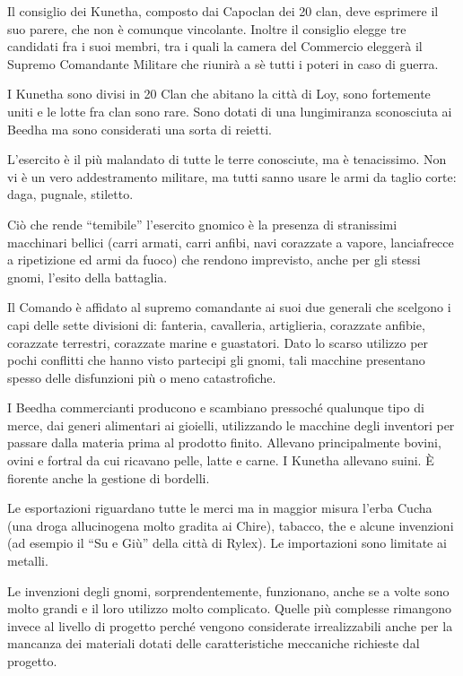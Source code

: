 Il consiglio dei Kunetha, composto dai Capoclan dei 20 clan, deve
esprimere il suo parere, che non \`e comunque vincolante.  Inoltre il
consiglio elegge tre candidati fra i suoi membri, tra i quali la
camera del Commercio elegger\`a il Supremo Comandante Militare che
riunir\`a a s\`e tutti i poteri in caso di guerra.

I Kunetha sono divisi in 20 Clan che abitano la citt\`a di Loy, sono
fortemente uniti e le lotte fra clan sono rare. Sono dotati di una
lungimiranza sconosciuta ai Beedha ma sono considerati una sorta di
reietti.

\Esercito L'esercito \`e il pi\`u malandato di tutte le terre
conosciute, ma \`e tenacissimo.  Non vi \`e un vero addestramento
militare, ma tutti sanno usare le armi da taglio corte: daga, pugnale,
stiletto.  

Ci\`o che rende ``temibile'' l'esercito gnomico \`e la presenza di
stranissimi macchinari bellici (carri armati, carri anfibi, navi
corazzate a vapore, lanciafrecce a ripetizione ed armi da fuoco) che
rendono imprevisto, anche per gli stessi gnomi, l'esito della
battaglia.

Il Comando \`e affidato al supremo comandante ai suoi due generali che
scelgono i capi delle sette divisioni di: fanteria, cavalleria,
artiglieria, corazzate anfibie, corazzate terrestri, corazzate marine
e guastatori. Dato lo scarso utilizzo per pochi conflitti che hanno
visto partecipi gli gnomi, tali macchine presentano spesso delle
disfunzioni pi\`u o meno catastrofiche.

\Economia I Beedha commercianti producono e scambiano pressoch\'e
qualunque tipo di merce, dai generi alimentari ai gioielli, utilizzando
le macchine degli inventori per passare dalla materia prima al
prodotto finito.  Allevano principalmente bovini, ovini e fortral da
cui ricavano pelle, latte e carne. I Kunetha allevano suini.  \`E
fiorente anche la gestione di bordelli.

Le esportazioni riguardano tutte le merci ma in maggior misura l'erba
Cucha (una droga allucinogena molto gradita ai Chire), tabacco, the e
alcune invenzioni (ad esempio il ``Su e Gi\`u'' della citt\`a di
Rylex). Le importazioni sono limitate ai metalli.

Le invenzioni degli gnomi, sorprendentemente, funzionano, anche se a
volte sono molto grandi e il loro utilizzo molto complicato. Quelle
pi\`u complesse rimangono invece al livello di progetto perch\'e
vengono considerate irrealizzabili anche per la mancanza dei
materiali dotati delle caratteristiche meccaniche richieste dal progetto.

